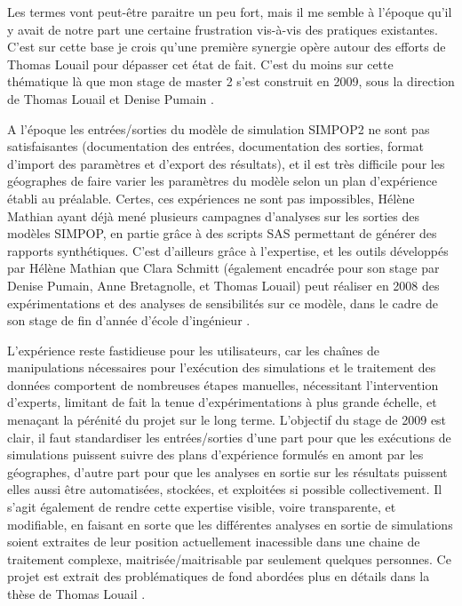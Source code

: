 Les termes vont peut-être paraitre un peu fort, mais il me semble à l'époque qu'il y avait de notre part une certaine frustration vis-à-vis des pratiques existantes. C'est sur cette base je crois qu'une première synergie opère autour des efforts de Thomas Louail pour dépasser cet état de fait. C'est du moins sur cette thématique là que mon stage de master 2 s'est construit en 2009, sous la direction de Thomas Louail et Denise Pumain \autocite{Rey2009}.

A l'époque les entrées/sorties du modèle de simulation SIMPOP2 ne sont pas satisfaisantes (documentation des entrées, documentation des sorties, format d'import des paramètres et d'export des résultats), et il est très difficile pour les géographes de faire varier les paramètres du modèle selon un plan d'expérience établi au préalable. Certes, ces expériences ne sont pas impossibles, Hélène Mathian ayant déjà mené plusieurs campagnes d'analyses sur les sorties des modèles SIMPOP, en partie grâce à des scripts SAS permettant de générer des rapports synthétiques. C'est d'ailleurs grâce à l'expertise, et les outils développés par Hélène Mathian que Clara Schmitt (également encadrée pour son stage par Denise Pumain, Anne Bretagnolle, et Thomas Louail) peut réaliser en 2008 des expérimentations et des analyses de sensibilités sur ce modèle, dans le cadre de son stage de fin d'année d'école d'ingénieur \autocite{Schmitt2008}.

L'expérience reste fastidieuse pour les utilisateurs, car les chaînes de manipulations nécessaires pour l'exécution des simulations et le traitement des données comportent de nombreuses étapes manuelles, nécessitant l'intervention d'experts, limitant de fait la tenue d'expérimentations à plus grande échelle, et menaçant la pérénité du projet sur le long terme. L'objectif du stage de 2009 est clair, il faut standardiser les entrées/sorties d'une part pour que les exécutions de simulations puissent suivre des plans d'expérience formulés en amont par les géographes, d'autre part pour que les analyses en sortie sur les résultats puissent elles aussi être automatisées, stockées, et exploitées si possible collectivement. Il s'agit également de rendre cette expertise visible, voire transparente, et modifiable, en faisant en sorte que les différentes analyses en sortie de simulations soient extraites de leur position actuellement inacessible dans une chaine de traitement complexe, maitrisée/maitrisable par seulement quelques personnes. Ce projet est extrait des problématiques de fond abordées plus en détails dans la thèse de Thomas Louail \autocite[132-145]{Louail2010}.

